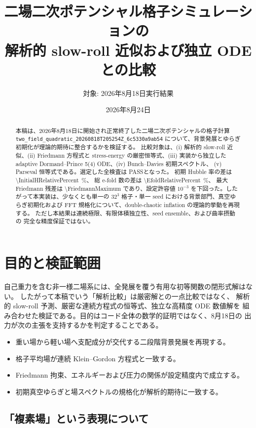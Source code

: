 \documentclass[a4paper,11pt]{ltjsarticle}
\title{二場二次ポテンシャル格子シミュレーションの\\
解析的 slow-roll 近似および独立 ODE との比較}
\author{対象: \code{MultifieldInflationLattice} 2026年8月18日実行結果}
\date{2026年8月24日}
\newcommand{\code}[1]{\texttt{#1}}
\newcommand{\pass}{\textcolor{green!45!black}{PASS}}
\begin{document}
\maketitle

\begin{abstract}
本稿は、2026年8月18日に開始され正常終了した二場二次ポテンシャルの格子計算
\code{two\_field\_quadratic\_20260818T205254Z\_6c5330a9ab54}
について、背景発展とゆらぎ初期化が理論的期待に整合するかを検証する。
比較対象は、(i) 解析的 slow-roll 近似、(ii) Friedmann 方程式と
stress-energy の厳密恒等式、(iii) 実装から独立した adaptive
Dormand--Prince 5(4) ODE、(iv) Bunch--Davies 初期スペクトル、
(v) Parseval 恒等式である。選定した全検査は \pass となった。
初期 Hubble 率の差は \SI{\InitialHRelativePercent}{\percent}、
総 e-fold 数の差は \SI{\EfoldRelativePercent}{\percent}、
最大 Friedmann 残差は \num{\FriedmannMaximum} であり、設定許容値
$10^{-3}$ を下回った。したがって本実装は、少なくとも単一の
$32^3$ 格子・単一 seed における背景部門、真空ゆらぎ初期化および
FFT 規格化について、double-chaotic inflation の理論的挙動を再現する。
ただし本結果は連続極限、有限体積独立性、seed ensemble、および曲率摂動の
完全な精度保証ではない。
\end{abstract}

\section{目的と検証範囲}

自己重力を含む非一様二場系には、全発展を覆う有用な初等関数の閉形式解はない。
したがって本稿でいう「解析比較」は厳密解との一点比較ではなく、
解析的 slow-roll 予測、厳密な連続方程式の恒等式、独立な高精度 ODE 数値解を
組み合わせた検証である。目的はコード全体の数学的証明ではなく、8月18日の
出力が次の主張を支持するかを判定することである。

\begin{itemize}
  \item 重い場から軽い場へ支配成分が交代する二段階背景発展を再現する。
  \item 格子平均場が連続 Klein--Gordon 方程式と一致する。
  \item Friedmann 拘束、エネルギーおよび圧力の関係が設定精度内で成立する。
  \item 初期真空ゆらぎと場スペクトルの規格化が解析的期待に一致する。
\end{itemize}

\subsection{「複素場」という表現について}
\end{document}

